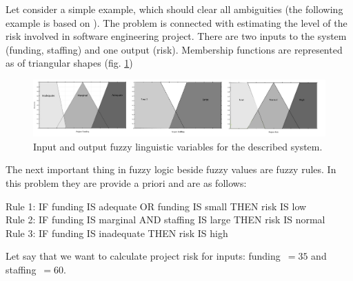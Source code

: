 Let consider a simple example, which should clear all ambiguities (the following 
example is based on \cite{bib0}). The problem is connected with estimating the
level of the risk involved in software engineering project. There are two
inputs to the system (funding, staffing) and one output
(risk). Membership functions are represented as of triangular shapes (fig. \ref{fig:fuzzy_example_1}) 
\begin{figure}[H]
    \begin{center}
        \includegraphics[width=\textwidth]{fig/fuzzy_example_1.png}
    \end{center}
    \caption{Input and output fuzzy linguistic variables for the described
    system.}
    \label{fig:fuzzy_example_1}
\end{figure}
The next important thing in fuzzy logic beside fuzzy values are fuzzy rules. In
this problem they are provide a priori and are as follows:
\begin{table}[H]
    Rule 1: IF funding IS adequate OR funding IS small THEN risk IS
    low \\
    Rule 2: IF funding IS marginal AND staffing IS large THEN risk IS
    normal \\
    Rule 3: IF funding IS inadequate THEN risk IS high
\end{table}
Let say that we want to calculate project risk for inputs: funding~$=35$ and
staffing~$=60$. 

